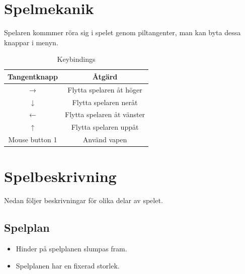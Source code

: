 \documentclass{TDP005mall}
\begin{document}
  \section{Spelmekanik}
  Spelaren kommmer röra sig i spelet genom piltangenter, man kan byta dessa knappar i menyn.
  \begin{table}[H]
    \begin{center}
      \begin{tabular}{ |c|c| }
        \hline
        \textbf{Tangentknapp} & \textbf{Åtgärd} \\
        \hline
        → & Flytta spelaren åt höger \\
        \hline
        ↓ & Flytta spelaren neråt \\
        \hline
        ← & Flytta spelaren åt vänster \\
        \hline
        ↑ & Flytta spelaren uppåt \\
        \hline
        Mouse button 1 & Använd vapen \\
        \hline
      \end{tabular}
    \end{center}
    \caption{Keybindings}
    \label{tab:movement}
  \end{table}

  \section{Spelbeskrivning}
  Nedan följer beskrivningar för olika delar av spelet.
  
  \subsection{Spelplan}
  \begin{itemize}
    \item Hinder på spelplanen slumpas fram.
    \item Spelplanen har en fixerad storlek.
  \end{itemize}
\end{document}
